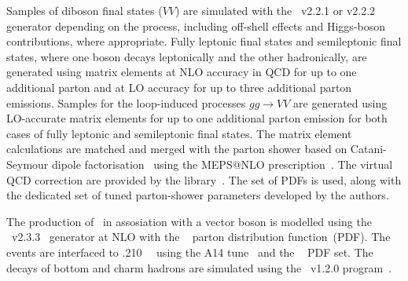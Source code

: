 \documentclass[letterpaper,12pt]{article}
\begin{document}
Samples of diboson final states ($VV$) are simulated with the
\sherpa~v2.2.1 or v2.2.2~\cite{Bothmann:2019yzt} generator depending on the process,
including off-shell effects and Higgs-boson contributions, where appropriate.
Fully leptonic final states and semileptonic final states, where one boson
decays leptonically and the other hadronically, are generated using
matrix elements at NLO accuracy in QCD for up to one additional parton
and at LO accuracy for up to three additional parton
emissions. Samples for the loop-induced processes $gg \to VV$ are
generated using LO-accurate matrix elements for up to one
additional parton emission for both cases of fully leptonic and
semileptonic final states. The matrix element calculations are matched
and merged with the \sherpa parton shower based on Catani-Seymour
dipole factorisation~\cite{Gleisberg:2008fv,Schumann:2007mg} using the MEPS@NLO
prescription~\cite{Hoeche:2011fd,Hoeche:2012yf,Catani:2001cc,Hoeche:2009rj}.
The virtual QCD correction are provided by the
\openloops library~\cite{Buccioni:2019sur,Cascioli:2011va,Denner:2016kdg}. The
\nnpdfnnlo set of PDFs is used, %
along with the dedicated set of tuned parton-shower parameters developed by the
\sherpa authors.

The production of \ttbar\ in assosiation with a vector boson 
is modelled using the
\mgamc~v2.3.3~\cite{Alwall:2014hca} generator at NLO with the
\nnpdfnlo~\cite{Ball:2014uwa} parton distribution function~(PDF).
The events are interfaced to \pythia.210~\cite{Sjostrand:2014zea}~
using the A14 tune~\cite{ATL-PHYS-PUB-2014-021} and the
\nnpdftwo~\cite{Ball:2014uwa} PDF set. The decays of bottom and charm
hadrons are simulated using the \evtgen\ v1.2.0 program~\cite{Lange:2001uf}.
\end{document}
